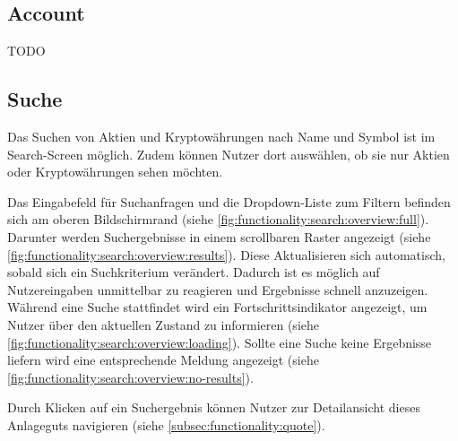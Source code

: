 \documentclass[a4paper]{article}
\begin{document}
\subsection{Account}
\label{subsec:functionality:account}
TODO


\subsection{Suche}
\label{subsec:functionality:search}
Das Suchen von Aktien und Kryptowährungen nach Name und Symbol ist im Search-Screen möglich.
Zudem können Nutzer dort auswählen, ob sie nur Aktien oder Kryptowährungen sehen möchten.

Das Eingabefeld für Suchanfragen und die Dropdown-Liste zum Filtern befinden sich am oberen Bildschirmrand (siehe \autoref{fig:functionality:search:overview:full}).
Darunter werden Suchergebnisse in einem scrollbaren Raster angezeigt (siehe \autoref{fig:functionality:search:overview:results}).
Diese Aktualisieren sich automatisch, sobald sich ein Suchkriterium verändert.
Dadurch ist es möglich auf Nutzereingaben unmittelbar zu reagieren und Ergebnisse schnell anzuzeigen.
Während eine Suche stattfindet wird ein Fortschritts\-indikator angezeigt, um Nutzer über den aktuellen Zustand zu informieren (siehe \autoref{fig:functionality:search:overview:loading}).
Sollte eine Suche keine Ergebnisse liefern wird eine entsprechende Meldung angezeigt (siehe \autoref{fig:functionality:search:overview:no-results}).

Durch Klicken auf ein Suchergebnis können Nutzer zur Detailansicht dieses Anlageguts navigieren (siehe \autoref{subsec:functionality:quote}).
\end{document}

